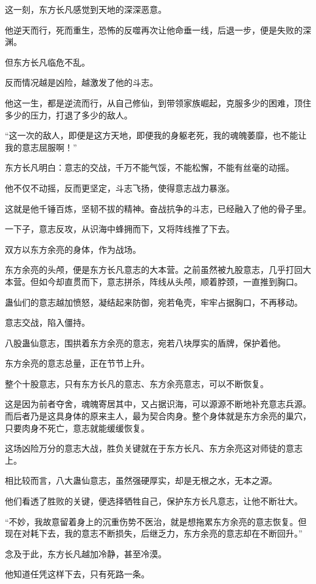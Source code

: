 \begin{this_body}
这一刻，东方长凡感觉到天地的深深恶意。

他逆天而行，死而重生，恐怖的反噬再次让他命垂一线，后退一步，便是失败的深渊。

但东方长凡临危不乱。

反而情况越是凶险，越激发了他的斗志。

他这一生，都是逆流而行，从自己修仙，到带领家族崛起，克服多少的困难，顶住多少的压力，打退了多少的敌人。

“这一次的敌人，即便是这方天地，即便我的身躯老死，我的魂魄萎靡，也不能让我的意志屈服啊！”

东方长凡明白：意志的交战，千万不能气馁，不能松懈，不能有丝毫的动摇。

他不仅不动摇，反而更坚定，斗志飞扬，使得意志战力暴涨。

这就是他千锤百炼，坚韧不拔的精神。奋战抗争的斗志，已经融入了他的骨子里。

一下子，意志反攻，从识海中蜂拥而下，又将阵线推了下去。

双方以东方余亮的身体，作为战场。

东方余亮的头颅，便是东方长凡意志的大本营。之前虽然被九股意志，几乎打回大本营。但如今却直贯而下，意志拼杀，阵线从头颅，顺着脖颈，一直推到胸口。

蛊仙们的意志越加愤怒，凝结起来防御，宛若龟壳，牢牢占据胸口，不再移动。

意志交战，陷入僵持。

八股蛊仙意志，围拱着东方余亮的意志，宛若八块厚实的盾牌，保护着他。

东方余亮的意志总量，正在节节上升。

整个十股意志，只有东方长凡的意志、东方余亮意志，可以不断恢复。

这是因为前者夺舍，魂魄寄居其中，又占据识海，可以源源不断地补充意志兵源。而后者乃是这具身体的原来主人，最为契合肉身。整个身体就是东方余亮的巢穴，只要肉身不死亡，意志就能缓缓恢复。

这场凶险万分的意志大战，胜负关键就在于东方长凡、东方余亮这对师徒的意志上。

相比较而言，八大蛊仙意志，虽然强硬厚实，却是无根之水，无本之源。

他们看透了胜败的关键，便选择牺牲自己，保护东方长凡意志，让他不断壮大。

“不妙，我故意留着身上的沉重伤势不医治，就是想拖累东方余亮的意志恢复。但现在对耗下去，我的意志不断损失，后继乏力，东方余亮的意志却在不断回升。”

念及于此，东方长凡越加冷静，甚至冷漠。

他知道任凭这样下去，只有死路一条。


\end{this_body}
